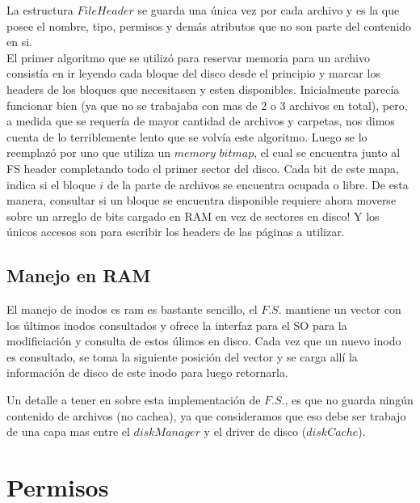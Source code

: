 \documentclass[english]{article}
\begin{document}
La estructura $File$$Header$ se guarda una única vez por cada archivo
y es la que posee el nombre, tipo, permisos y demás atributos que
no son parte del contenido en si.\\


El primer algoritmo que se utilizó para reservar memoria para un archivo
consistía en ir leyendo cada bloque del disco desde el principio
y marcar los headers de los bloques que necesitasen y esten disponibles. 
Inicialmente parecía funcionar bien (ya que no se trabajaba con mas de 2 o 3
 archivos en total), pero, a medida que se requería de mayor cantidad de 
archivos y carpetas, nos dimos cuenta de lo terriblemente
lento que se volvía este algoritmo. Luego se lo reemplazó por uno
que utiliza un $memory$ $bitmap$, el cual se encuentra junto al
FS header completando todo el primer sector del disco. Cada bit de este
mapa, indica si el bloque $i$ de la parte de archivos se encuentra
ocupada o libre. De esta manera, consultar si un bloque se encuentra disponible 
requiere ahora moverse sobre un arreglo de bits cargado en RAM en vez de 
sectores en disco! Y los únicos accesos son para escribir los headers de las 
páginas a utilizar.


\subsection{Manejo en RAM}

El manejo de inodos es ram es bastante sencillo, el $F.S.$ mantiene
un vector con los últimos inodos consultados y ofrece la interfaz
para el SO para la modificiación y consulta de estos úlimos en disco.
Cada vez que un nuevo inodo es consultado, se toma la siguiente posición
del vector y se carga allí la información de disco de este inodo para
luego retornarla.

Un detalle a tener en sobre esta implementación de $F.S.$, es que
no guarda ningún contenido de archivos (no cachea), ya que consideramos
que eso debe ser trabajo de una capa mas entre el $diskManager$ y
el driver de disco ($diskCache$).

\pagebreak{}

\section{Permisos}
\end{document}
